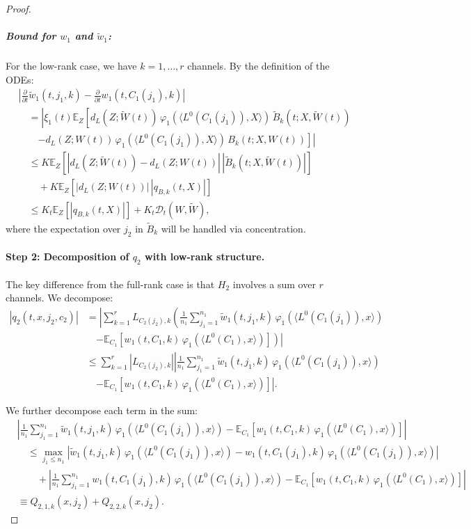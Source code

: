 \documentclass[nohyperref]{article}
\theoremstyle{plain}
\theoremstyle{definition}
\theoremstyle{remark}
\begin{document}
\begin{proof}
\subparagraph*{Bound for $w_1$ and $\tilde{w}_1$:}
For the low-rank case, we have $k = 1, \ldots, r$ channels. By the definition of the ODEs:
\begin{align*}
&\left|\frac{\partial}{\partial t}\tilde{w}_1(t, j_1, k) - \frac{\partial}{\partial t}w_1(t, C_1(j_1), k)\right|\\
&\quad = \left|\xi_1(t)\mathbb{E}_Z\left[d_L(Z; \tilde{W}(t))\,\varphi_1(\langle L^0(C_1(j_1)), X\rangle)\,\tilde{B}_k(t; X, \tilde{W}(t))\right.\right.\\
&\quad\quad\left.\left. - d_L(Z; W(t))\,\varphi_1(\langle L^0(C_1(j_1)), X\rangle)\,B_k(t; X, W(t))\right]\right|\\
&\quad \le K\mathbb{E}_Z\left[|d_L(Z; \tilde{W}(t)) - d_L(Z; W(t))|\,|\tilde{B}_k(t; X, \tilde{W}(t))|\right]\\
&\quad\quad + K\mathbb{E}_Z\left[|d_L(Z; W(t))|\,|q_{B,k}(t, X)|\right]\\
&\quad \le K_t\mathbb{E}_Z\left[|q_{B,k}(t, X)|\right] + K_t\mathscr{D}_t(W, \tilde{W}),
\end{align*}
where the expectation over $j_2$ in $\tilde{B}_k$ will be handled via concentration.

\paragraph*{Step 2: Decomposition of $q_2$ with low-rank structure.}

The key difference from the full-rank case is that $H_2$ involves a sum over $r$ channels. We decompose:
\begin{align*}
|q_2(t, x, j_2, c_2)| &= \left|\sum_{k=1}^r L_{C_2(j_2),k}\left(\frac{1}{n_1}\sum_{j_1=1}^{n_1}\tilde{w}_1(t, j_1, k)\,\varphi_1(\langle L^0(C_1(j_1)), x\rangle)\right.\right.\\
&\quad\left.\left. - \mathbb{E}_{C_1}[w_1(t, C_1, k)\,\varphi_1(\langle L^0(C_1), x\rangle)]\right)\right|\\
&\le \sum_{k=1}^r |L_{C_2(j_2),k}|\left|\frac{1}{n_1}\sum_{j_1=1}^{n_1}\tilde{w}_1(t, j_1, k)\,\varphi_1(\langle L^0(C_1(j_1)), x\rangle)\right.\\
&\quad\left. - \mathbb{E}_{C_1}[w_1(t, C_1, k)\,\varphi_1(\langle L^0(C_1), x\rangle)]\right|.
\end{align*}

We further decompose each term in the sum:
\begin{align*}
&\left|\frac{1}{n_1}\sum_{j_1=1}^{n_1}\tilde{w}_1(t, j_1, k)\,\varphi_1(\langle L^0(C_1(j_1)), x\rangle) - \mathbb{E}_{C_1}[w_1(t, C_1, k)\,\varphi_1(\langle L^0(C_1), x\rangle)]\right|\\
&\quad \le \max_{j_1 \le n_1}\left|\tilde{w}_1(t, j_1, k)\,\varphi_1(\langle L^0(C_1(j_1)), x\rangle) - w_1(t, C_1(j_1), k)\,\varphi_1(\langle L^0(C_1(j_1)), x\rangle)\right|\\
&\quad\quad + \left|\frac{1}{n_1}\sum_{j_1=1}^{n_1}w_1(t, C_1(j_1), k)\,\varphi_1(\langle L^0(C_1(j_1)), x\rangle) - \mathbb{E}_{C_1}[w_1(t, C_1, k)\,\varphi_1(\langle L^0(C_1), x\rangle)]\right|\\
&\equiv Q_{2,1,k}(x, j_2) + Q_{2,2,k}(x, j_2).
\end{align*}


\end{proof}
\end{document}
